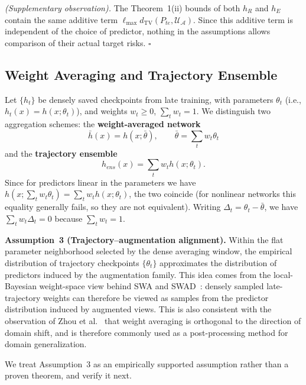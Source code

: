 \documentclass[electronics,article,submit,moreauthors]{Definitions/mdpi}
\begin{document}
\emph{(Supplementary observation).} The Theorem~1(ii) bounds of both $h_R$ and $h_E$ contain the same additive term $\ell_{\max}d_{\mathrm{TV}}(P_{te},\mathcal{U}_{\mathcal{A}})$. Since this additive term is independent of the choice of predictor, nothing in the assumptions allows comparison of their actual target risks. \hfill$\square$

\subsection{Weight Averaging and Trajectory Ensemble}

Let $\{h_t\}$ be densely saved checkpoints from late training, with parameters $\theta_t$ (i.e., $h_t(x)=h(x;\theta_t)$), and weights $w_t\geq 0$, $\sum_t w_t=1$. We distinguish two aggregation schemes: the \textbf{weight-averaged network}
\begin{equation}
\bar h(x)=h(x;\bar\theta),\qquad \bar\theta=\sum_t w_t\theta_t
\end{equation}
and the \textbf{trajectory ensemble}
\begin{equation}
h_{ens}(x)=\sum_t w_t h(x;\theta_t).
\end{equation}
Since for predictors linear in the parameters we have $h(x;\sum_t w_t\theta_t)=\sum_t w_t h(x;\theta_t)$, the two coincide (for nonlinear networks this equality generally fails, so they are not equivalent). Writing $\Delta_t=\theta_t-\bar\theta$, we have $\sum_t w_t\Delta_t=0$ because $\sum_t w_t=1$.

\noindent\textbf{Assumption~3 (Trajectory--augmentation alignment).} Within the flat parameter neighborhood selected by the dense averaging window, the empirical distribution of trajectory checkpoints $\{\theta_t\}$ approximates the distribution of predictors induced by the augmentation family. This idea comes from the local-Bayesian weight-space view behind SWA and SWAD~\citep{ref42}: densely sampled late-trajectory weights can therefore be viewed as samples from the predictor distribution induced by augmented views. This is also consistent with the observation of Zhou et al.~\citep{ref4} that weight averaging is orthogonal to the direction of domain shift, and is therefore commonly used as a post-processing method for domain generalization.

We treat Assumption~3 as an empirically supported assumption rather than a proven theorem, and verify it next.
\end{document}
